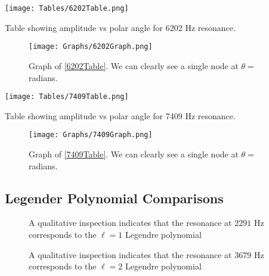 \begin{multicols}{2}	
	\begin{table}[H]
		\texttt{[image: Tables/6202Table.png]}
		\caption{Table showing amplitude vs polar angle for 6202 Hz resonance.}
		\label{6202Table}		
	\end{table}
	\columnbreak
	\begin{figure}[H]
		\texttt{[image: Graphs/6202Graph.png]}
		\caption{Graph of \cref{6202Table}. We can clearly see a single node at $\theta = $ radians.}
		\label{6202Graph}
	\end{figure}
\end{multicols}


\begin{multicols}{2}	
	\begin{table}[H]
		\texttt{[image: Tables/7409Table.png]}
		\caption{Table showing amplitude vs polar angle for 7409 Hz resonance.}
		\label{7409Table}		
	\end{table}
	\columnbreak
	\begin{figure}[H]
		\texttt{[image: Graphs/7409Graph.png]}
		\caption{Graph of \cref{7409Table}. We can clearly see a single node at $\theta = $ radians.}
		\label{7409Graph}
	\end{figure}
\end{multicols}


\subsection{Legender Polynomial Comparisons}
\begin{figure}[H]
	\centering
	\qquad
	\caption{A qualitative inspection indicates that the resonance at $2291$ Hz corresponds to the $\ell=1$ Legendre polynomial}
	\label{legendre1}
\end{figure}

\begin{figure}[H]
	\centering
	\qquad
	\caption{A qualitative inspection indicates that the resonance at $3679$ Hz corresponds to the $\ell=2$ Legendre polynomial}
	\label{legendre2}
\end{figure}


